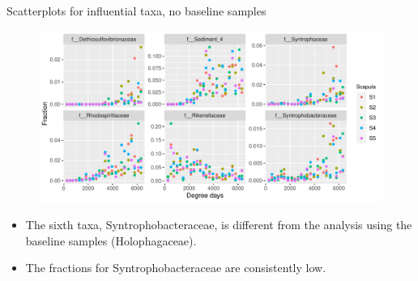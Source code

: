 \documentclass{beamer}
\begin{document}
\begin{frame}{Scatterplots for influential taxa, no baseline samples}

  \begin{center}
    \begin{figure}
      \includegraphics[width=4.75in]{RiceRivers/bacteria/use_families/w_scapulae/no_baseline/infl_scap_family_no_baseline_scatter}
    \end{figure}
  \end{center}
  \vspace{-0.25in}
  {\scriptsize
  \begin{itemize}
  \item The sixth taxa, Syntrophobacteraceae, is different from the
    analysis using the baseline samples (Holophagaceae).
    \item The fractions for Syntrophobacteraceae are consistently low.
  \end{itemize}
  }

\end{frame}
\end{document}
